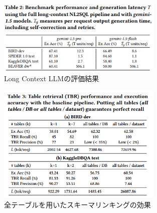 \documentclass[dvipdfmx,uplatex]{jsarticle}
\theoremstyle{remark}
\begin{document}
\begin{figure}
    \centering
    \includegraphics[width=0.7\textwidth]{img/long-context-nl2sql/result.png}
    \caption{Long Context LLMの評価結果}
    \label{fig:full-result}
\end{figure}

\begin{figure}
    \centering
    \includegraphics[width=0.7\textwidth]{img/long-context-nl2sql/all-table.png}
    \caption{全テーブルを用いたスキーマリンキングの効果}
    \label{fig:all-table}
\end{figure}
\end{document}
